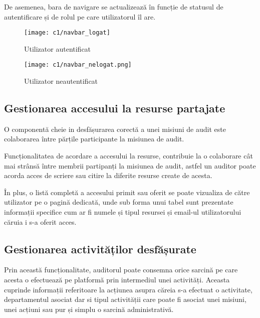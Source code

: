 \newpage
   De asemenea, bara de navigare se actualizează în funcție de statusul de autentificare și de rolul pe care utilizatorul îl are.
   \begin{figure}[h]
   	\centering
   	\begin{minipage}{.5\textwidth}
   		\centering
   		\texttt{[image: c1/navbar\_logat]}
   		\caption{Utilizator autentificat}
   		
   	\end{minipage}%
   	\begin{minipage}{.5\textwidth}
   		\centering
   		\texttt{[image: c1/navbar\_nelogat.png]}
   		\caption{Utilizator neautentificat}
   		
   	\end{minipage}
   	
   	
   \end{figure}

	\subsection{Gestionarea accesului la resurse partajate}
	
	 O componentă cheie in desfășurarea corectă a unei misiuni de audit este colaborarea între părțile participante la misiunea de audit.
	 
		Funcționalitatea de acordare a accesului la resurse, contribuie la o colaborare cât mai strânsă între membrii partipanți la misiunea de audit, astfel un auditor poate acorda acces de scriere sau citire la diferite resurse create de acesta.
		
		În plus, o listă completă a accesului primit sau oferit se poate vizualiza de către utilizator pe o pagină dedicată, unde sub forma unui tabel sunt prezentate informații specifice cum ar fi numele și tipul resursei și email-ul utilizatorului căruia i s-a oferit  acces.
		
	\subsection{Gestionarea activităților desfășurate}
	 Prin această funcționalitate, auditorul poate consemna orice sarcină pe care acesta o efectuează pe platformă prin intermediul unei activități. Aceasta cuprinde informații referitoare la acțiunea asupra căreia s-a efectuat o activitate, departamentul asociat dar si tipul activității care poate fi asociat unei misiuni, unei acțiuni sau pur și simplu o sarcină administrativă.
	 
